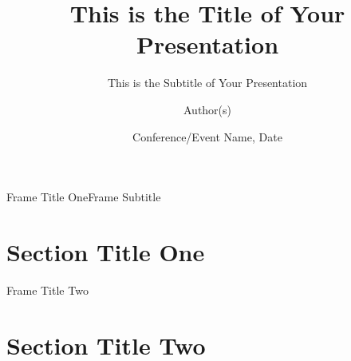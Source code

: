 \documentclass[10pt, aspectratio=43]{beamer}
\title{This is the Title of Your Presentation}
\subtitle{This is the Subtitle of Your Presentation}
\author{Author(s)}
\institute[USD]{%
    Department of XYZ \par%
    University of South Dakota \par%
    Vermillion, USA \par%
}
\date{Conference/Event Name, Date}
\begin{document}
\maketitle

\begin{frame}[t]{Frame Title One}{Frame Subtitle}
    \lipsum[3]
\end{frame}

\section{Section Title One}

\begin{frame}[t]{Frame Title Two}
    \lipsum[4]
\end{frame}

\section{Section Title Two}
\end{document}
